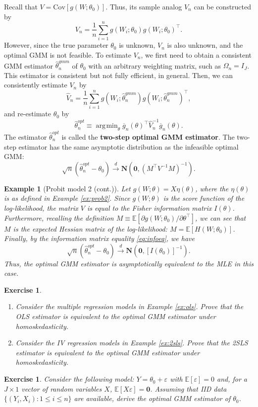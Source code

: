 \documentclass[10.5pt, A4paper, openany, uplatex]{book}
\newcommand{\mbf}{\mathbf}
\newcommand{\eps}{\varepsilon}
\newcommand{\E}{\mathbb{E}}
\newcommand{\Cov}{\mathrm{Cov}}
\renewcommand{\hat}{\widehat}
\renewcommand{\bar}{\overline}
\newtheorem{example}[theorem]{Example}
\newtheorem{exercise}[theorem]{Exercise}
\numberwithin{equation}{section}
\DeclareMathOperator*{\argmin}{\arg\!\min}
\begin{document}
Recall that $V = \Cov[g(W; \theta_0)]$.
Thus, its sample analog $V_n$ can be constructed by
\[
	V_n = \frac{1}{n} \sum_{i = 1}^n g(W_i; \theta_0)g(W_i; \theta_0)^\top.
\]
However, since the true parameter $\theta_0$ is unknown, $V_n$ is also unknown, and the optimal GMM is not feasible.
To estimate $V_n$, we first need to obtain a consistent GMM estimator $\hat\theta_n^{gmm}$ of $\theta_0$ with an arbitrary weighting matrix, such as $\Omega_n = I_J$.
This estimator is consistent but not fully efficient, in general.
Then, we can consistently estimate $V_n$ by
\[
	\hat V_n  = \frac{1}{n} \sum_{i = 1}^n g(W_i; \hat\theta_n^{gmm})g(W_i; \hat\theta_n^{gmm})^\top,
\]
and re-estimate $\theta_0$ by
\[
	\hat\theta_n^{opt} \equiv \argmin_{\theta} \bar{g}_n(\theta)^\top \hat V_n^{-1} \bar{g}_n(\theta).
 \] 
 The estimator $\hat\theta_n^{opt} $ is called the \textbf{two-step optimal GMM estimator}.
The two-step estimator has the same asymptotic distribution as the infeasible optimal GMM:
\[
	\sqrt{n} (\hat\theta_n^{opt} - \theta_0)  \overset{d}{\to} \mbf{N}\left(\mbf{0},  (M^\top V^{-1} M )^{-1}  \right).
\]

\begin{example}[Probit model 2 (cont.)]\upshape
	Let $g(W; \theta) = X\eta(\theta)$, where the $\eta(\theta)$ is as defined in Example \ref{ex:prob2}.
	Since $g(W; \theta)$ is the score function of the log-likelihood, the matrix $V$ is equal to the Fisher information matrix $I(\theta)$.
	Furthermore, recalling the definition $M \equiv  \E[ \partial g(W; \theta_0) / \partial \theta^\top]$, we can see that $M$ is the expected Hessian matrix of the log-likelihood: $M = \E[H(W; \theta_0)]$.
	Finally, by the information matrix equality \eqref{eq:infoeq}, we have
	\[
	\sqrt{n} (\hat\theta_n^{opt} - \theta_0)  \overset{d}{\to} \mbf{N}\left(\mbf{0}, [I(\theta_0)]^{-1}  \right).
	\]
	Thus, the optimal GMM estimator is asymptotically equivalent to the MLE in this case.
\end{example}

\begin{framed}
\begin{exercise}\upshape
	\begin{enumerate}
	\item Consider the multiple regression models in Example \ref{ex:ols}. 
	Prove that the OLS estimator is equivalent to the optimal GMM estimator under homoskedasticity.
	\item Consider the IV regression models in Example \ref{ex:2sls}.
	Prove that the 2SLS estimator is equivalent to the optimal GMM estimator under homoskedasticity.
	\end{enumerate}
\end{exercise}

\begin{exercise}\upshape
	Consider the following model: $Y = \theta_0 + \varepsilon$ with $\E[\eps] = 0$ and, for a $J \times 1$ vector of random variables $X$, $\E[X \varepsilon] = \mbf{0}$.
	Assuming that IID data $\{(Y_i,X_i): 1 \le i \le n\}$ are available, derive the optimal GMM estimator of $\theta_0$.
\end{exercise}
\end{framed}
\end{document}
